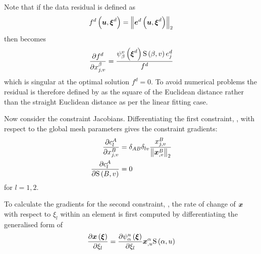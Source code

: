 Note that if the data residual is defined as
\begin{equation}
   f^{d}\left( \boldsymbol{u},\boldsymbol{\xi}^{d} \right) = {\left\| 
     \boldsymbol{e}^{d}\left( \boldsymbol{u},\boldsymbol{\xi}^{d} \right)  \right\|_{2}} 
\end{equation}
then  becomes
\begin{equation}
   \dfrac{\partial f^{d}}{\partial x^{\beta}_{j,v}} =\dfrac{   \psi_{\beta}^{v} \left( 
      \boldsymbol{\xi}^{d} \right)     \mathrm{S} \left( \beta,v \right)  
    e^{d}_{j}}{f^{d}}
\end{equation}
which is singular at the optimal solution $f^{d}=0$. To avoid numerical
problems the residual is therefore defined by  as the
square of the Euclidean distance rather than the straight Euclidean distance
as per the linear fitting case.

Now consider the constraint Jacobians. Differentiating the first constraint,
, with respect to the global mesh parameters gives
the constraint gradients:
\begin{align}
  \delby{c^{A}_{l}}{x^{B}_{j,v}}&=\kronecker{A}{B}
  \kronecker{l}{v}\dfrac{x^{B}_{j,v}}{\norm{
      \vectr{x}^{B}_{,v}}} \label{eqn:normjacderiv} \\ 
  \delby{c^{A}_{l}}{\gsf{B}{v}}&=0 \label{eqn:normjacline}
\end{align}
for $l=1,2$.

To calculate the gradients for the second constraint,
, the rate of change of $\boldsymbol{x}$ with respect
to $\xi_{l}$ within an element is first computed by differentiating the
generalised form of  \ie
\begin{equation}
  \delby{\fnof{\vectr{x}}{\vectr{\xi}}}{\xi_{l}}=\delby{\gbfn{\alpha}{u}{
      \vectr{\xi}}}{\xi_{l}}\vectr{x}^{\alpha}_{,u}\gsf{\alpha}{u}
  \label{eqn:delxdelxiinterp}
\end{equation}

